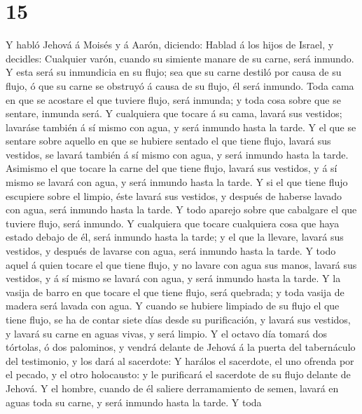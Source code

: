 \hypertarget{section-14}{%
\section{15}\label{section-14}}

 Y habló Jehová á Moisés y á Aarón, diciendo: 
Hablad á los hijos de Israel, y decidles: Cualquier varón, cuando su
simiente manare de su carne, será inmundo.  Y esta será su
inmundicia en su flujo; sea que su carne destiló por causa de su flujo,
ó que su carne se obstruyó á causa de su flujo, él será inmundo.
 Toda cama en que se acostare el que tuviere flujo, será
inmunda; y toda cosa sobre que se sentare, inmunda será.  Y
cualquiera que tocare á su cama, lavará sus vestidos; lavaráse también á
sí mismo con agua, y será inmundo hasta la tarde.  Y el que
se sentare sobre aquello en que se hubiere sentado el que tiene flujo,
lavará sus vestidos, se lavará también á sí mismo con agua, y será
inmundo hasta la tarde.  Asimismo el que tocare la carne del
que tiene flujo, lavará sus vestidos, y á sí mismo se lavará con agua, y
será inmundo hasta la tarde.  Y si el que tiene flujo
escupiere sobre el limpio, éste lavará sus vestidos, y después de
haberse lavado con agua, será inmundo hasta la tarde.  Y
todo aparejo sobre que cabalgare el que tuviere flujo, será inmundo.
 Y cualquiera que tocare cualquiera cosa que haya estado
debajo de él, será inmundo hasta la tarde; y el que la llevare, lavará
sus vestidos, y después de lavarse con agua, será inmundo hasta la
tarde.  Y todo aquel á quien tocare el que tiene flujo, y
no lavare con agua sus manos, lavará sus vestidos, y á sí mismo se
lavará con agua, y será inmundo hasta la tarde.  Y la
vasija de barro en que tocare el que tiene flujo, será quebrada; y toda
vasija de madera será lavada con agua.  Y cuando se hubiere
limpiado de su flujo el que tiene flujo, se ha de contar siete días
desde su purificación, y lavará sus vestidos, y lavará su carne en aguas
vivas, y será limpio.  Y el octavo día tomará dos tórtolas,
ó dos palominos, y vendrá delante de Jehová á la puerta del tabernáculo
del testimonio, y los dará al sacerdote:  Y harálos el
sacerdote, el uno ofrenda por el pecado, y el otro holocausto: y le
purificará el sacerdote de su flujo delante de Jehová.  Y
el hombre, cuando de él saliere derramamiento de semen, lavará en aguas
toda su carne, y será inmundo hasta la tarde.  Y toda
